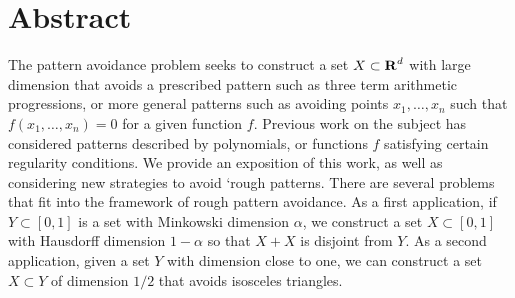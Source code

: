 
\chapter{Abstract}


The pattern avoidance problem seeks to construct a set $X \subset \operatorname{\mathbf{R}}^d$ with large dimension that avoids a prescribed pattern such as three term arithmetic progressions, or more general patterns such as avoiding points $x_1, \dots, x_n$ such that $f(x_1, \dots, x_n) = 0$ for a given function $f$. Previous work on the subject has considered patterns described by polynomials, or functions $f$ satisfying certain regularity conditions. We provide an exposition of this work, as well as considering new strategies to avoid `rough patterns. There are several problems that fit into the framework of rough pattern avoidance. As a first application, if $Y\subset[0,1]$ is a set with Minkowski dimension $\alpha$, we construct a set $X\subset[0,1]$ with Hausdorff dimension $1-\alpha$ so that $X+X$ is disjoint from $Y$. As a second application, given a set $Y$ with dimension close to one, we can construct a set $X\subset Y$ of dimension $1/2$ that avoids isosceles triangles.